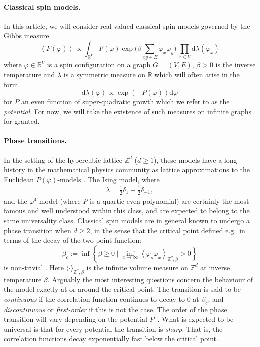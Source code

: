 \documentclass{article}
\numberwithin{equation}{section}
\theoremstyle{definition}
\theoremstyle{definition}
\theoremstyle{remark}
\renewcommand{\d}{\mathrm{d}}
\newcommand\vp{\varphi}
\newcommand\R{\mathbb{R}}
\renewcommand{\d}{\mathrm{d}}
\newcommand{\Z}{\mathbb{Z}}
\renewcommand{\l}{\lambda}
\begin{document}





\paragraph{Classical spin models.}
In this article, we will consider real-valued classical spin models governed by the Gibbs measure
\[
	\left< F(\vp) \right>_{}^{} \propto \int_{\R^V} F(\vp) \exp\Big( \beta \sum_{xy \in E} \vp_x \vp_y \Big) \,\prod_{x \in V} \d\l(\vp_x)
\] 
where $\vp \in \R^V$ is a spin configuration on a graph $G = (V,E)$, $\beta > 0$ is the inverse temperature and $\l$ is a symmetric measure on $\R$ which will often arise in the form
\[
\d\l(\vp) \propto \exp(-P(\vp)) \d\vp
\] 
for $P$ an even function of super-quadratic growth which we refer to as the \emph{potential}. For now, we will take the existence of such measures on infinite graphs for granted.

\paragraph{Phase transitions. }In the setting of the hypercubic lattice $\Z^d$ ($d \geq 1$), these models have a long history in the mathematical physics community as lattice approximations to the Euclidean $P(\vp)$-models \cite{GRS}. The Ising model, where
\begin{align} \label{eq:isingmeas}
	\l = \tfrac{1}{2}\delta_1 + \tfrac{1}{2}\delta_{-1},
\end{align}
and the $\vp^4$ model (where $P$ is a quartic even polynomial) are certainly the most famous and well understood within this class, and are expected to belong to the same universality class. Classical spin models are in general known to undergo a phase transition when $d \geq 2$, in the sense that the critical point defined e.g.~in terms of the decay of the two-point function:
\[
	\beta_c := \inf \left\{ \beta \geq 0 \mid \inf_{x \to \infty} \left<\vp_o \vp_x \right>_{\Z^d,\beta} > 0 \right\} 
\] 
is non-trivial \cite{Pei36,glimm1975phase}. Here $\langle \cdot \rangle_{\Z^d,\beta} $ is the infinite volume measure on $\mathbb Z^d$ at inverse temperature $\beta$. Arguably the most interesting questions concern the behaviour of the model exactly at or around the critical point. The transition is said to be \emph{continuous} if the correlation function continues to decay to $0$ at $\beta_c$, and \emph{discontinuous} or \emph{first-order} if this is not the case. The order of the phase transition will vary depending on the potential $P$~\cite{FriVel}. 
What is expected to be universal is that for every potential the transition is \emph{sharp}. That is, the correlation functions decay exponentially fast below the critical point. 
\end{document}
